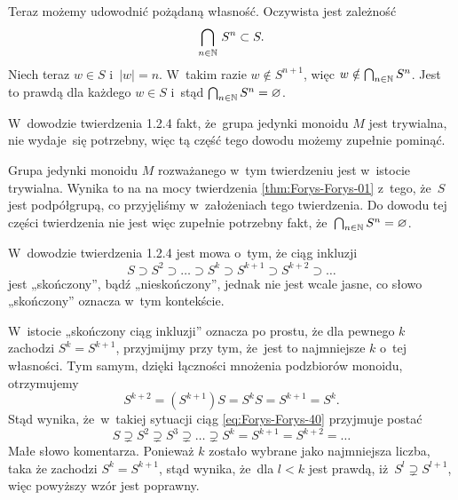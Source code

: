 \documentclass[a4paper,11pt]{article}
\begin{document}
Teraz możemy udowodnić pożądaną własność. Oczywista jest zależność
\begin{equation}
  \label{eq:Forys-Forys-39}
  \bigcap_{ n \in \mathbb{N} } \, S^{ n } \subset S.
\end{equation}
Niech teraz $w \in S$ i~$| w | = n$. W~takim razie $w \notin S^{ n + 1 }$,
więc $w \notin \bigcap_{ n \in \mathbb{N} } S^{ n }$. Jest to prawdą dla każdego $w \in S$
i~stąd $\bigcap_{ n \in \mathbb{N} } S^{ n } = \varnothing$.

\vspace{\spaceFour}





\start {} W~dowodzie twierdzenia 1.2.4 fakt, że~grupa jedynki monoidu
$M$ jest trywialna, nie wydaje~się potrzebny, więc tą część tego dowodu
możemy zupełnie pominąć.

Grupa jedynki monoidu $M$ rozważanego w~tym twierdzeniu jest w~istocie
trywialna. Wynika to na na mocy twierdzenia \ref{thm:Forys-Forys-01}
z~tego, że~$S$ jest podpółgrupą, co przyjęliśmy w~założeniach tego
twierdzenia. Do dowodu tej części twierdzenia nie jest więc zupełnie
potrzebny fakt, że~$\bigcap_{ n \in \mathbb{N} } S^{ n } = \varnothing$.

\vspace{\spaceFour}





\start {} W~dowodzie twierdzenia 1.2.4 jest mowa o~tym, że ciąg
inkluzji
\begin{equation}
  \label{eq:Forys-Forys-40}
  S \supset S^{ 2 } \supset \ldots \supset S^{ k } \supset S^{ k + 1 } \supset S^{ k + 2 } \supset \ldots
\end{equation}
jest „skończony”, bądź „nieskończony”, jednak nie jest wcale jasne, co
słowo „skończony” oznacza w~tym kontekście.

W~istocie „skończony ciąg inkluzji” oznacza po prostu, że dla pewnego $k$
zachodzi $S^{ k } = S^{ k + 1 }$, przyjmijmy przy tym, że~jest to najmniejsze
$k$ o~tej własności. Tym samym, dzięki łączności mnożenia podzbiorów
monoidu, otrzymujemy
\begin{equation}
  \label{eq:Forys-Forys-41}
  S^{ k + 2 } = ( S^{ k + 1 } ) S = S^{ k } S = S^{ k + 1 } = S^{ k }.
\end{equation}
Stąd wynika, że~w~takiej sytuacji ciąg \eqref{eq:Forys-Forys-40} przyjmuje
postać
\begin{equation}
  \label{eq:Forys-Forys-42}
  S \supsetneq S^{ 2 } \supsetneq S^{ 3 } \supsetneq \ldots \supsetneq S^{ k } = S^{ k + 1 } = S^{ k + 2 } = \ldots
\end{equation}
Małe słowo komentarza. Ponieważ $k$ zostało wybrane jako najmniejsza
liczba, taka że zachodzi $S^{ k } = S^{ k + 1 }$, stąd wynika, że~dla $l < k$
jest prawdą, iż~$S^{ l } \supsetneq S^{ l + 1 }$, więc powyższy wzór jest poprawny.
\end{document}
